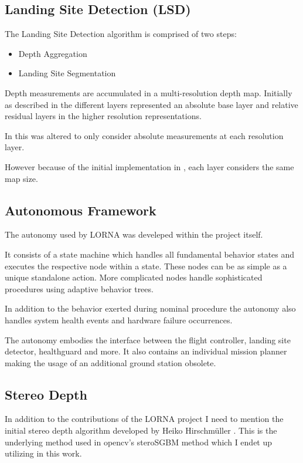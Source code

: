 \subsection{Landing Site Detection (LSD)}\label{subsec:related_work:LSD}

The Landing Site Detection algorithm is comprised of two steps: 

\begin{itemize}
    \item Depth Aggregation
    \item Landing Site Segmentation
\end{itemize}

Depth measurements are accumulated in a multi-resolution depth map. Initially as described in \citet{LSD1} the different layers represented an absolute base layer and relative residual layers in the higher resolution representations.

In \citet{LSD2} this was altered to only consider absolute measurements at each resolution layer. 

However because of the initial implementation in \citep{LSD1}, each layer considers the same map size. 



\subsection{Autonomous Framework}

The autonomy \citep{Autonomy} used by LORNA was develeped within the project itself. 

It consists of a state machine which handles all fundamental behavior states and executes the respective node within a state. These nodes can be as simple as a unique standalone action. More complicated nodes handle sophisticated procedures using adaptive behavior trees. 

In addition to the behavior exerted during nominal procedure the autonomy also handles system health events and hardware failure occurrences.

The autonomy embodies the interface between the flight controller, landing site detector, healthguard and more. It also contains an individual mission planner making the usage of an additional ground station obsolete.

\subsection{Stereo Depth}

In addition to the contributions of the LORNA project I need to mention the initial stereo depth algorithm developed by Heiko Hirschmüller \citep{Stereo}. This is the underlying method used in opencv's steroSGBM method which I endet up utilizing in this work.